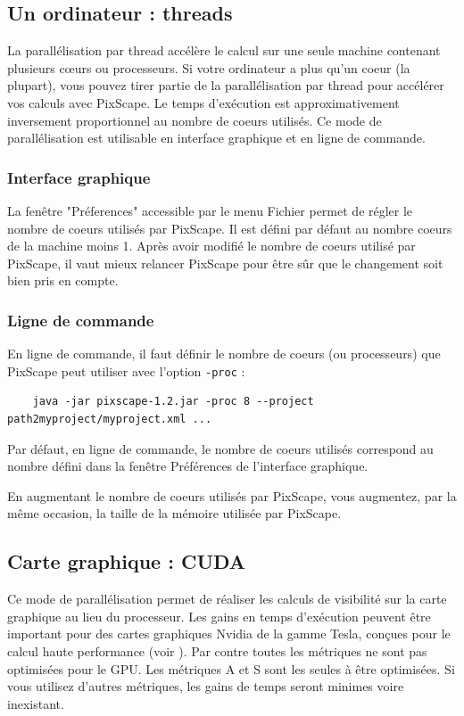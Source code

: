 \documentclass{report}
\begin{document}
\subsection{Un ordinateur : threads}
\label{thread}
La parallélisation par thread accélère le calcul sur une seule machine contenant plusieurs cœurs ou processeurs.
Si votre ordinateur a plus qu'un coeur (la plupart), vous pouvez tirer partie de la parallélisation par thread pour accélérer vos calculs avec PixScape. Le temps d'exécution est approximativement inversement proportionnel au nombre de coeurs utilisés. Ce mode de parallélisation est utilisable en interface graphique et en ligne de commande.

\subsubsection{Interface graphique}
La fenêtre "Préferences" accessible par le menu Fichier permet de régler le nombre de coeurs utilisés par PixScape. Il est défini par défaut au nombre coeurs de la machine moins 1. Après avoir modifié le nombre de coeurs utilisé par PixScape, il vaut mieux relancer PixScape pour être sûr que le changement soit bien pris en compte.

\subsubsection{Ligne de commande}
En ligne de commande, il faut définir le nombre de coeurs (ou processeurs) que PixScape peut utiliser avec l'option \verb|-proc| :
\begin{Verbatim}
	java -jar pixscape-1.2.jar -proc 8 --project path2myproject/myproject.xml ...
\end{Verbatim}
Par défaut, en ligne de commande, le nombre de coeurs utilisés correspond au nombre défini dans la fenêtre Préférences de l'interface graphique.

En augmentant le nombre de coeurs utilisés par PixScape, vous augmentez, par la même occasion, la taille de la mémoire utilisée par PixScape.

\subsection{Carte graphique : CUDA}
\label{cuda}
Ce mode de parallélisation permet de réaliser les calculs de visibilité sur la carte graphique au lieu du processeur. Les gains en temps d'exécution peuvent être important pour des cartes graphiques Nvidia de la gamme Tesla, conçues pour le calcul haute performance (voir ). Par contre toutes les métriques ne sont pas optimisées pour le GPU. Les métriques A et S sont les seules à être optimisées. Si vous utilisez d'autres métriques, les gains de temps seront minimes voire inexistant.
\end{document}
